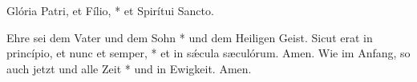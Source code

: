 \documentclass[fontsize=10pt,paper=A5,twoside,BCOR=1mm,DIV=21,headinclude]{scrarticle}
\begin{document}
\begin{paracol}{2}
\begin{psalmus}









\switchcolumn*

Glória Patri, et Fílio, * et Spirítui Sancto.
	\switchcolumn

	Ehre sei dem Vater und dem Sohn * und dem Heiligen Geist.
\switchcolumn*
Sicut erat in princípio, et nunc et semper, * et in s\'æcula sæculórum. Amen.
	\switchcolumn
	Wie im Anfang, so auch jetzt und alle Zeit * und in Ewigkeit. Amen.
\end{psalmus}
\end{paracol}

\end{document}

